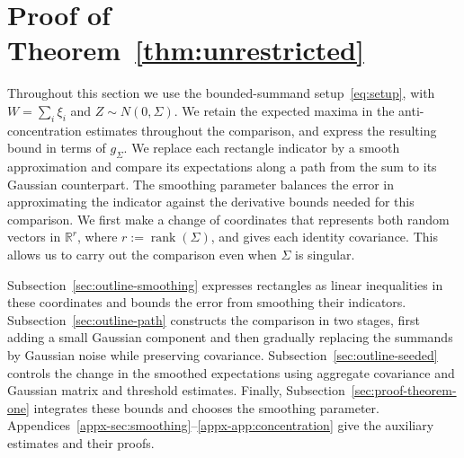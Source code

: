\documentclass[11pt,letterpaper,twoside,leqno]{article}
\theoremstyle{bookplain}
\theoremstyle{bookremark}
\newcommand{\R}{\mathbb R}
\begin{document}
\section{{Proof of Theorem~\ref*{thm:unrestricted}}}\label{sec:smoothing}
Throughout this section we use the bounded-summand setup~\eqref{eq:setup},
with \(W=\sum_i\xi_i\) and \(Z\sim N(0,\Sigma)\).
{We retain the expected maxima in the anti-concentration estimates
throughout the comparison, and express the resulting bound in terms
of \(g_\Sigma\).}
We replace each rectangle indicator by a smooth approximation and compare
its expectations along a path from the sum to its Gaussian counterpart.
The smoothing parameter balances the error in approximating the indicator
against the derivative bounds needed for this comparison.
We first make a change of coordinates that represents both random vectors
in \(\R^r\), where \(r:=\operatorname{rank}(\Sigma)\), and gives each
identity covariance. This allows us to carry out the comparison even
when \(\Sigma\) is singular.

{
Subsection~\ref{sec:outline-smoothing} expresses rectangles as linear
inequalities in these coordinates and bounds the error from smoothing
their indicators. Subsection~\ref{sec:outline-path} constructs the
comparison in two stages, first adding a small Gaussian component and
then gradually replacing the summands by Gaussian noise while preserving
covariance. Subsection~\ref{sec:outline-seeded} controls the change in
the smoothed expectations using aggregate covariance and Gaussian matrix
and threshold estimates. Finally, Subsection~\ref{sec:proof-theorem-one}
integrates these bounds and chooses the smoothing parameter.
Appendices~\ref{appx-sec:smoothing}--\ref{appx-app:concentration}
give the auxiliary estimates and their proofs.
}
\end{document}
